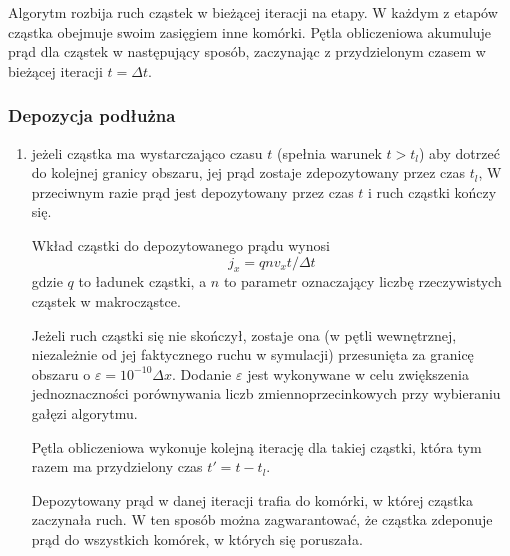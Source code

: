 Algorytm rozbija ruch cząstek w bieżącej iteracji na etapy. W każdym z
etapów cząstka obejmuje swoim zasięgiem inne komórki. Pętla obliczeniowa
akumuluje prąd dla cząstek w następujący sposób, zaczynając z przydzielonym
czasem w bieżącej iteracji $t = \Delta t$.

\subsubsection{Depozycja podłużna} 
\begin{enumerate}
    \itemi{} obliczany jest czas potrzebny cząstce na dotarcie do kolejnej
    granicy obszaru
    \begin{equation}
        t_l = (x - x_g)/v
    \end{equation}
    Granica obszaru jest definiowana jako najbliższa połowa komórki Eulera w kierunku
    ruchu cząstki.
    \item
    \begin{itemize}
        \itemi{} jeżeli cząstka ma wystarczająco czasu $t$ (spełnia warunek $t > t_l$) aby
        dotrzeć do kolejnej granicy obszaru, jej prąd zostaje zdepozytowany przez czas $t_l$,
        \itemi{} W przeciwnym razie prąd jest depozytowany przez czas $t$ i ruch cząstki kończy się.
    \end{itemize}
    Wkład cząstki do depozytowanego prądu wynosi
    \begin{equation}
        j_x = q n v_x t/\Delta t
    \end{equation}
    gdzie $q$ to ładunek cząstki, a $n$ to parametr  oznaczający liczbę
    rzeczywistych cząstek w makrocząstce.

    \itemi{} Jeżeli ruch cząstki się nie skończył, zostaje ona (w pętli
    wewnętrznej, niezależnie od jej faktycznego ruchu w symulacji)
    przesunięta za granicę obszaru o $\varepsilon =
    10^{-10} \Delta x$. Dodanie $\varepsilon$ jest wykonywane w celu zwiększenia
    jednoznaczności porównywania liczb zmiennoprzecinkowych przy wybieraniu
    gałęzi algorytmu.

    Pętla obliczeniowa wykonuje kolejną iterację dla takiej cząstki, która tym razem
    ma przydzielony czas $t' = t - t_l$.

    Depozytowany prąd w danej iteracji trafia do komórki, w której cząstka zaczynała ruch. W ten sposób
    można zagwarantować, że cząstka zdeponuje prąd do wszystkich komórek, w których się poruszała.
\end{enumerate}

